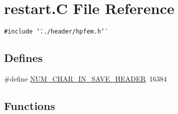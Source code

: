 \hypertarget{restart_8C}{
\section{restart.C File Reference}
\label{restart_8C}
}
{\tt \#include \char`\"{}../header/hpfem.h\char`\"{}}\par
\subsection*{Defines}
\begin{CompactItemize}
\item 
\#define \hyperlink{restart_8C_a0}{NUM\_\-CHAR\_\-IN\_\-SAVE\_\-HEADER}\ 16384
\end{CompactItemize}
\subsection*{Functions}
